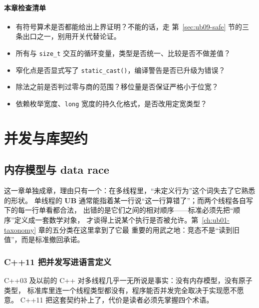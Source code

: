 \documentclass[12pt,a4paper,fontset=fandol]{ctexbook}
\newcommand{\cpp}[1]{C++#1}
\newcommand{\Fn}[1]{\texttt{#1()}}
\newcommand{\Tp}[1]{\texttt{#1}}
\newcommand{\UB}{\textbf{\textsf{UB}}}
\begin{document}
\subsection{本章检查清单}\label{sec:ub09-checklist}

\begin{itemize}
  \item 有符号算术是否都能给出上界证明？不能的话，走
        第~\ref{sec:ub09-safe} 节的三条出口之一，别用开关代替论证。
  \item 所有与 \Tp{size\_t} 交互的循环变量，类型是否统一、比较是否不做差值？
  \item 窄化点是否显式写了 \Fn{static\_cast}，编译警告是否已升级为错误？
  \item 除法之前是否判过零与商的范围？移位量是否保证严格小于位宽？
  \item 依赖枚举宽度、\Tp{long} 宽度的持久化格式，是否改用定宽类型？
\end{itemize}

\part{并发与库契约}
\chapter{内存模型与 data race}\label{ch:ub10-memory-model}

这一章单独成章，理由只有一个：在多线程里，“未定义行为”这个词失去了它熟悉的形状。
单线程的 \UB{} 通常能指着某一行说“这一行算错了”；而两个线程各自写下的每一行单看都合法，
出错的是它们之间的相对顺序——标准必须先把“顺序”定义成一套数学对象，
才谈得上说某个执行是否被允许。第~\ref{ch:ub01-taxonomy} 章的五分类在这里拿到了它最
重要的用武之地：竞态不是“读到旧值”，而是标准撤回承诺。

\section{\cpp{11} 把并发写进语言定义}\label{sec:ub10-terms}

\cpp{03} 及以前的 C++ 对多线程几乎一无所说是事实：没有内存模型，没有原子类型，
标准库里连一个线程类型都没有，程序能否并发完全取决于实现愿不愿意。
\cpp{11} 把这套契约补上了，代价是读者必须先掌握四个术语。
\end{document}
